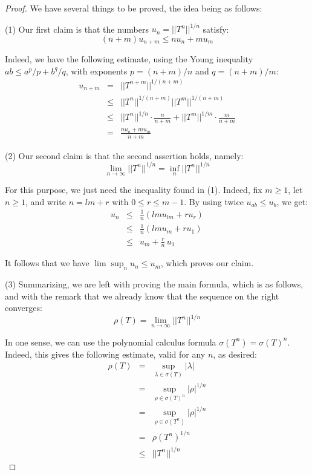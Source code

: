\documentclass[12pt]{amsbook}
\begin{document}
\begin{proof}
We have several things to be proved, the idea being as follows:

\medskip

(1) Our first claim is that the numbers $u_n=||T^n||^{1/n}$ satisfy:
$$(n+m)u_{n+m}\leq nu_n+mu_m$$

Indeed, we have the following estimate, using the Young inequality $ab\leq a^p/p+b^q/q$, with exponents $p=(n+m)/n$ and $q=(n+m)/m$:
\begin{eqnarray*}
u_{n+m}
&=&||T^{n+m}||^{1/(n+m)}\\
&\leq&||T^n||^{1/(n+m)}||T^m||^{1/(n+m)}\\
&\leq&||T^n||^{1/n}\cdot\frac{n}{n+m}+||T^m||^{1/m}\cdot\frac{m}{n+m}\\
&=&\frac{nu_n+mu_m}{n+m}
\end{eqnarray*}

(2) Our second claim is that the second assertion holds, namely:
$$\lim_{n\to\infty}||T^n||^{1/n}=\inf_n||T^n||^{1/n}$$

For this purpose, we just need the inequality found in (1). Indeed, fix $m\geq1$, let $n\geq1$, and write $n=lm+r$ with $0\leq r\leq m-1$. By using twice $u_{ab}\leq u_b$, we get:
\begin{eqnarray*}
u_n
&\leq&\frac{1}{n}( lmu_{lm}+ru_r)\\
&\leq&\frac{1}{n}( lmu_{m}+ru_1)\\
&\leq&u_{m}+\frac{r}{n}\,u_1
\end{eqnarray*}

It follows that we have $\lim\sup_nu_n\leq u_m$, which proves our claim.

\medskip

(3) Summarizing, we are left with proving the main formula, which is as follows, and with the remark that we already know that the sequence on the right converges:
$$\rho(T)=\lim_{n\to\infty}||T^n||^{1/n}$$

In one sense, we can use the polynomial calculus formula $\sigma(T^n)=\sigma(T)^n$. Indeed, this gives the following estimate, valid for any $n$, as desired:
\begin{eqnarray*}
\rho(T)
&=&\sup_{\lambda\in\sigma(T)}|\lambda|\\
&=&\sup_{\rho\in\sigma(T)^n}|\rho|^{1/n}\\
&=&\sup_{\rho\in\sigma(T^n)}|\rho|^{1/n}\\
&=&\rho(T^n)^{1/n}\\
&\leq&||T^n||^{1/n}
\end{eqnarray*}


\end{proof}
\end{document}
